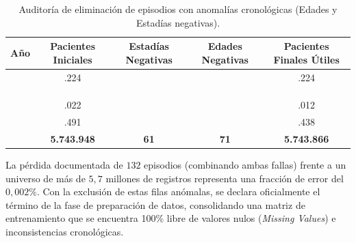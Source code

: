 \begin{table}[htbp]
\centering
\scriptsize
\setlength{\tabcolsep}{4pt}
\renewcommand{\arraystretch}{1.2}
\caption{Auditoría de eliminación de episodios con anomalías cronológicas (Edades y Estadías negativas).}
\label{tab:limpieza_fechas}
\begin{tabular}{|c|c|c|c|c|}
\hline
\parbox[t]{1.5cm}{\centering\textbf{Año}} & 
\parbox[t]{3.0cm}{\centering\textbf{Pacientes Iniciales}} & 
\parbox[t]{2.5cm}{\centering\textbf{Estadías Negativas}} & 
\parbox[t]{2.5cm}{\centering\textbf{Edades Negativas}} & 
\parbox[t]{3.0cm}{\centering\textbf{Pacientes Finales Útiles}} \\ \hline

\parbox[t]{1.5cm}{} & \parbox[t]{3.0cm}{.224} & \parbox[t]{2.5cm}{} & \parbox[t]{2.5cm}{} & \parbox[t]{3.0cm}{.224} \\ \hline
\parbox[t]{1.5cm}{} & \parbox[t]{3.0cm}{} & \parbox[t]{2.5cm}{} & \parbox[t]{2.5cm}{} & \parbox[t]{3.0cm}{} \\ \hline
\parbox[t]{1.5cm}{} & \parbox[t]{3.0cm}{} & \parbox[t]{2.5cm}{} & \parbox[t]{2.5cm}{} & \parbox[t]{3.0cm}{} \\ \hline
\parbox[t]{1.5cm}{} & \parbox[t]{3.0cm}{} & \parbox[t]{2.5cm}{} & \parbox[t]{2.5cm}{} & \parbox[t]{3.0cm}{} \\ \hline
\parbox[t]{1.5cm}{} & \parbox[t]{3.0cm}{.022} & \parbox[t]{2.5cm}{} & \parbox[t]{2.5cm}{} & \parbox[t]{3.0cm}{.012} \\ \hline
\parbox[t]{1.5cm}{} & \parbox[t]{3.0cm}{.491} & \parbox[t]{2.5cm}{} & \parbox[t]{2.5cm}{} & \parbox[t]{3.0cm}{.438} \\ \hline
{}\parbox[t]{1.5cm}{\centering\textbf{TOTAL}} & \parbox[t]{3.0cm}{\raggedleft\textbf{5.743.948}} & \parbox[t]{2.5cm}{\raggedleft\textbf{61}} & \parbox[t]{2.5cm}{\raggedleft\textbf{71}} & \parbox[t]{3.0cm}{\raggedleft\textbf{5.743.866}} \\ \hline
\end{tabular}
\end{table}

La pérdida documentada de $132$ episodios (combinando ambas fallas) frente a un universo de más de $5,7$ millones de registros representa una fracción de error del $0,002\%$. Con la exclusión de estas filas anómalas, se declara oficialmente el término de la fase de preparación de datos, consolidando una matriz de entrenamiento que se encuentra 100\% libre de valores nulos (\textit{Missing Values}) e inconsistencias cronológicas.